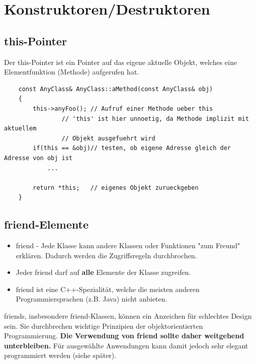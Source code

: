 \section{Konstruktoren/Destruktoren}
\label{sec:Konstruktoren/Destruktoren}

\subsection{this-Pointer}
\label{sec:this-Pointer}
Der this-Pointer ist ein Pointer auf das eigene aktuelle Objekt, welches eine Elementfunktion (Methode) aufgerufen hat.
\noindent
\begin{minipage}{\linewidth}
	\begin{lstlisting}
	const AnyClass& AnyClass::aMethod(const AnyClass& obj)
	{
		this->anyFoo();	// Aufruf einer Methode ueber this
				// 'this' ist hier unnoetig, da Methode implizit mit aktuellem
				// Objekt ausgefuehrt wird
		if(this == &obj)// testen, ob eigene Adresse gleich der Adresse von obj ist
			...
			
		return *this;	// eigenes Objekt zurueckgeben
	}
	\end{lstlisting}
\end{minipage}

\subsection{friend-Elemente}
\label{sec:friend-Elemente}
\begin{itemize}
	\item[\-] friend - Jede Klasse kann andere Klassen oder Funktionen "zum Freund" erklären. Dadurch werden die Zugriffsregeln durchbrochen.
	\item[\-] Jeder friend darf auf \textbf{alle} Elemente der Klasse zugreifen.
	\item[\-] friend ist eine C++-Spezialität, welche die meisten anderen Programmiersprachen (z.B. Java) nicht anbieten.
\end{itemize}
\begin{achtung}
	friends, insbesondere friend-Klassen, können ein Anzeichen für schlechtes Design sein. Sie durchbrechen wichtige Prinzipien der objektorientierten Programmierung.
	\textbf{Die Verwendung von friend sollte daher weitgehend unterbleiben.}
	\small{Für ausgewählte Anwendungen kann damit jedoch sehr elegant programmiert werden (siehe später).}
\end{achtung}

